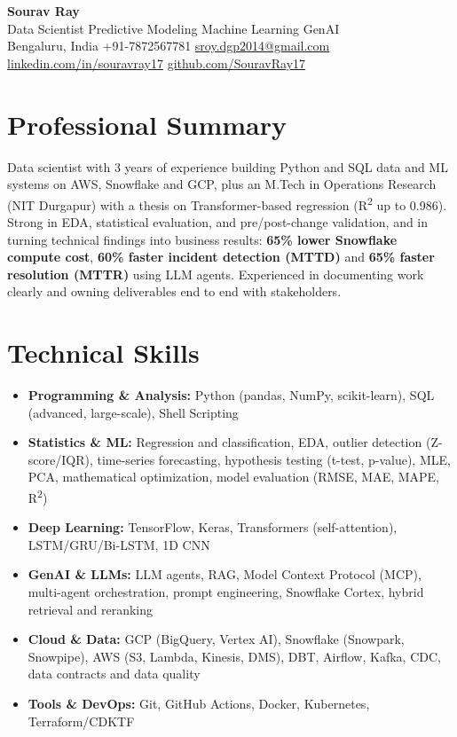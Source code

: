 \documentclass[10pt,a4paper]{article}
\begin{document}
\begin{center}
{\Huge\bfseries\color{accent} Sourav Ray}\\[3pt]
{\large Data Scientist \textbar{} Predictive Modeling \textbar{} Machine Learning \textbar{} GenAI}\\[3pt]
Bengaluru, India \textbar{} +91-7872567781 \textbar{} \href{mailto:sroy.dgp2014@gmail.com}{sroy.dgp2014@gmail.com} \textbar{}
\href{https://linkedin.com/in/souravray17}{linkedin.com/in/souravray17} \textbar{}
\href{https://github.com/SouravRay17}{github.com/SouravRay17}
\end{center}

\section*{Professional Summary}
Data scientist with 3 years of experience building Python and SQL data and ML systems on AWS, Snowflake and GCP, plus an M.Tech in Operations Research (NIT Durgapur) with a thesis on Transformer-based regression (R\textsuperscript{2} up to 0.986). Strong in EDA, statistical evaluation, and pre/post-change validation, and in turning technical findings into business results: \textbf{65\% lower Snowflake compute cost}, \textbf{60\% faster incident detection (MTTD)} and \textbf{65\% faster resolution (MTTR)} using LLM agents. Experienced in documenting work clearly and owning deliverables end to end with stakeholders.

\section*{Technical Skills}
\begin{itemize}[label={},leftmargin=0pt,itemsep=1pt]
\item \textbf{Programming \& Analysis:} Python (pandas, NumPy, scikit-learn), SQL (advanced, large-scale), Shell Scripting
\item \textbf{Statistics \& ML:} Regression and classification, EDA, outlier detection (Z-score/IQR), time-series forecasting, hypothesis testing (t-test, p-value), MLE, PCA, mathematical optimization, model evaluation (RMSE, MAE, MAPE, R\textsuperscript{2})
\item \textbf{Deep Learning:} TensorFlow, Keras, Transformers (self-attention), LSTM/GRU/Bi-LSTM, 1D CNN
\item \textbf{GenAI \& LLMs:} LLM agents, RAG, Model Context Protocol (MCP), multi-agent orchestration, prompt engineering, Snowflake Cortex, hybrid retrieval and reranking
\item \textbf{Cloud \& Data:} GCP (BigQuery, Vertex AI), Snowflake (Snowpark, Snowpipe), AWS (S3, Lambda, Kinesis, DMS), DBT, Airflow, Kafka, CDC, data contracts and data quality
\item \textbf{Tools \& DevOps:} Git, GitHub Actions, Docker, Kubernetes, Terraform/CDKTF
\end{itemize}
\end{document}
